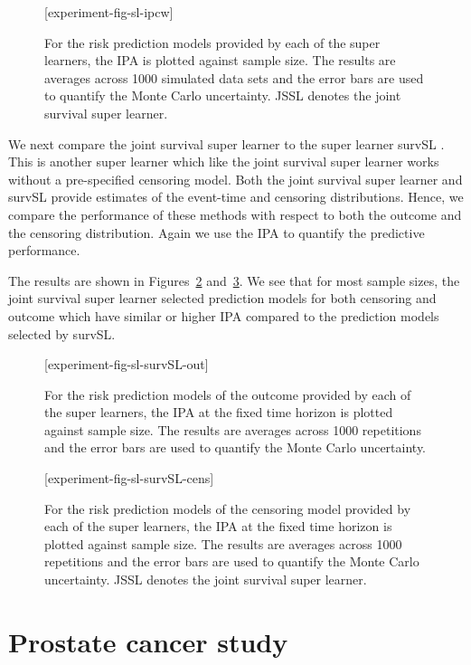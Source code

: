 \documentclass[lineno]{biometrika}
\newcommand{\1}{\mathds{1}}
\begin{document}
\begin{figure}
\figurebox{20pc}{25pc}{}[experiment-fig-sl-ipcw]
\caption{For the risk prediction models provided by each of the
    super learners, the IPA is plotted against sample size. The
    results are averages across 1000 simulated data sets and the error
    bars are used to quantify the Monte Carlo uncertainty. JSSL
    denotes the joint survival super learner. }
\label{fig:ipcw-fail}
\end{figure}

We next compare the joint survival super learner to the super learner
survSL \citep{westling2021inference}. This is another super learner
which like the joint survival super learner works without a
pre-specified censoring model. Both the joint survival super learner
and survSL provide estimates of the event-time and censoring
distributions. Hence, we compare the performance of these methods with
respect to both the outcome and the censoring distribution. Again we
use the IPA to quantify the predictive performance.

The results are shown in Figures~\ref{fig:zelefski-out}
and~\ref{fig:zelefski-cens}. We see that for most sample sizes, the joint survival super learner selected prediction models for both censoring and outcome which
have similar or higher IPA compared to the prediction models selected
by survSL.
\begin{figure}
\figurebox{20pc}{25pc}{}[experiment-fig-sl-survSL-out]
\caption{For the risk prediction models of the outcome provided by each
    of the super learners, the IPA at the fixed time horizon is plotted against
    sample size. The results are averages across 1000 repetitions and the error
    bars are used to quantify the Monte Carlo uncertainty. }
\label{fig:zelefski-out}
\end{figure}

\begin{figure}
\figurebox{20pc}{25pc}{}[experiment-fig-sl-survSL-cens]
\caption{For the risk prediction models of the censoring model
    provided by each of the super learners, the IPA at the fixed time
    horizon is plotted against sample size. The results are averages
    across 1000 repetitions and the error bars are used to quantify
    the Monte Carlo uncertainty. JSSL denotes the joint survival super
    learner.}
\label{fig:zelefski-cens}
\end{figure}


\section{Prostate cancer study}
\label{sec:real-data-appl}
\end{document}
